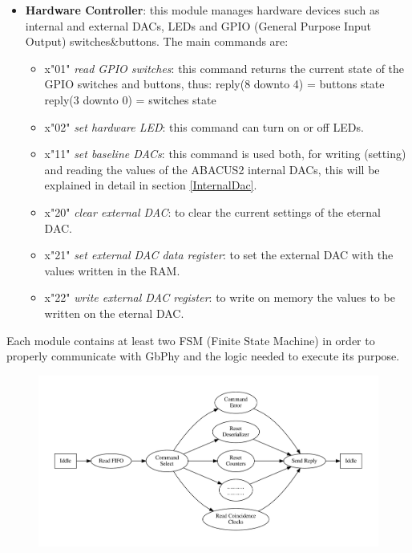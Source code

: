 \begin{itemize}
	\item \textbf{Hardware Controller}: this module manages hardware devices such as internal and external DACs, LEDs and GPIO (General Purpose Input Output) switches\&buttons. The main commands are:
	\begin{itemize}
		\item x"01" \textit{read GPIO switches}: this command returns the current state of the GPIO switches and buttons, thus:
		\newline
		reply(8 downto 4) = buttons state
		\newline
		reply(3 downto 0) = switches state
		\item x"02" \textit{set hardware LED}: this command can turn on or off LEDs.
		\item x"11" \textit{set baseline DACs}: this command is used both, for writing (setting) and reading the values of the ABACUS2 internal DACs, this will be explained in detail in section \ref{InternalDac}.
		\item x"20" \textit{clear external DAC}: to clear the current settings of the eternal DAC. 
		\item x"21" \textit{set external DAC data register}: to set the external DAC with the values written in the RAM.
		\item x"22" \textit{write external DAC register}: to write on memory the values to be written on the eternal DAC.
	\end{itemize}  
		
\end{itemize}
\noindent Each module contains at least two FSM (Finite State Machine) in order to properly communicate with GbPhy and the logic needed to execute its purpose.
\begin{figure}[H]
	\centering
	\includegraphics[width=1.0\linewidth]{FSMdiagrams/CMDtoTERA10.pdf}
	\caption{}
	\label{fig:fsmFIFO1}
\end{figure}

